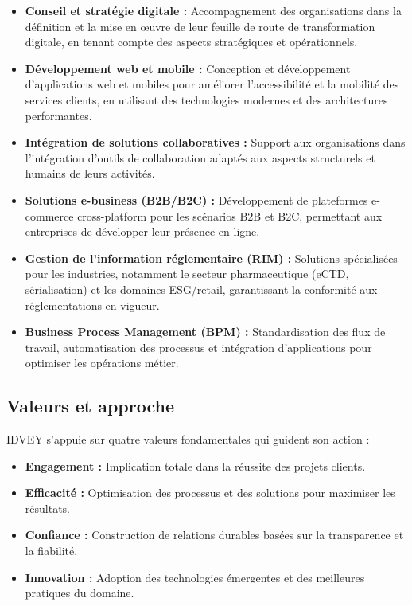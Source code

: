 \begin{itemize}
    \item \textbf{Conseil et stratégie digitale :} Accompagnement des organisations dans la définition et la mise en œuvre de leur feuille de route de transformation digitale, en tenant compte des aspects stratégiques et opérationnels.

    \item \textbf{Développement web et mobile :} Conception et développement d'applications web et mobiles pour améliorer l'accessibilité et la mobilité des services clients, en utilisant des technologies modernes et des architectures performantes.

    \item \textbf{Intégration de solutions collaboratives :} Support aux organisations dans l'intégration d'outils de collaboration adaptés aux aspects structurels et humains de leurs activités.

    \item \textbf{Solutions e-business (B2B/B2C) :} Développement de plateformes e-commerce cross-platform pour les scénarios B2B et B2C, permettant aux entreprises de développer leur présence en ligne.

    \item \textbf{Gestion de l'information réglementaire (RIM) :} Solutions spécialisées pour les industries, notamment le secteur pharmaceutique (eCTD, sérialisation) et les domaines ESG/retail, garantissant la conformité aux réglementations en vigueur.

    \item \textbf{Business Process Management (BPM) :} Standardisation des flux de travail, automatisation des processus et intégration d'applications pour optimiser les opérations métier.
\end{itemize}

\subsection{Valeurs et approche}
IDVEY s'appuie sur quatre valeurs fondamentales qui guident son action :

\begin{itemize}
    \item \textbf{Engagement :} Implication totale dans la réussite des projets clients.
    \item \textbf{Efficacité :} Optimisation des processus et des solutions pour maximiser les résultats.
    \item \textbf{Confiance :} Construction de relations durables basées sur la transparence et la fiabilité.
    \item \textbf{Innovation :} Adoption des technologies émergentes et des meilleures pratiques du domaine.
\end{itemize}

